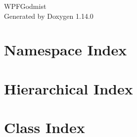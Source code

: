 \documentclass[twoside]{book}
\newcommand{\+}{\discretionary{\mbox{\scriptsize$\hookleftarrow$}}{}{}}
\newcommand{\clearemptydoublepage}{%
    \newpage{\pagestyle{empty}\cleardoublepage}%
  }
\begin{document}
  \raggedbottom
    \hypersetup{pageanchor=false,
                bookmarksnumbered=true,
                pdfencoding=unicode
               }
  \begin{titlepage}
  \vspace*{7cm}
  \begin{center}%
  {\Large WPFGodmist}\\
  \vspace*{1cm}
  {\large Generated by Doxygen 1.14.0}\\
  \end{center}
  \end{titlepage}
  \clearemptydoublepage
  \tableofcontents
  \clearemptydoublepage
  \hypersetup{pageanchor=true}
\chapter{Namespace Index}

\chapter{Hierarchical Index}

\chapter{Class Index}

\end{document}
